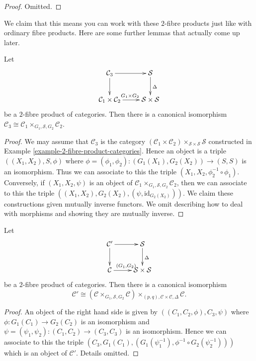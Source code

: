 \begin{proof}
Omitted.
\end{proof}

\noindent
We claim that this means you can work with these $2$-fibre products
just like with ordinary fibre products. Here are some further lemmas
that actually come up later.

\begin{lemma}
\label{lemma-diagonal-1}
Let
$$
\xymatrix{
\mathcal{C}_3 \ar[r] \ar[d] & \mathcal{S} \ar[d]^\Delta \\
\mathcal{C}_1 \times \mathcal{C}_2 \ar[r]^{G_1 \times G_2} &
\mathcal{S} \times \mathcal{S}
}
$$
be a $2$-fibre product of categories.
Then there is a canonical isomorphism
$\mathcal{C}_3 \cong
\mathcal{C}_1 \times_{G_1, \mathcal{S}, G_2} \mathcal{C}_2$.
\end{lemma}

\begin{proof}
We may assume that $\mathcal{C}_3$ is the category
$(\mathcal{C}_1 \times \mathcal{C}_2)\times_{\mathcal{S} \times \mathcal{S}}
\mathcal{S}$ constructed in Example \ref{example-2-fibre-product-categories}.
Hence an object is a triple
$((X_1, X_2), S, \phi)$ where
$\phi = (\phi_1, \phi_2) : (G_1(X_1), G_2(X_2)) \to (S, S)$
is an isomorphism. Thus we can associate to this the triple
$(X_1, X_2, \phi_2^{-1} \circ \phi_1)$.
Conversely, if $(X_1, X_2, \psi)$ is an object of
$\mathcal{C}_1 \times_{G_1, \mathcal{S}, G_2} \mathcal{C}_2$,
then we can associate to this the triple
$((X_1, X_2), G_2(X_2), (\psi, \text{id}_{G_2(X_2)}))$.
We claim these constructions given mutually inverse functors.
We omit describing how to deal with morphisms
and showing they are mutually inverse.
\end{proof}

\begin{lemma}
\label{lemma-diagonal-2}
Let
$$
\xymatrix{
\mathcal{C}' \ar[r] \ar[d] & \mathcal{S} \ar[d]^\Delta \\
\mathcal{C} \ar[r]^{(G_1, G_2)} &
\mathcal{S} \times \mathcal{S}
}
$$
be a $2$-fibre product of categories.
Then there is a canonical isomorphism
$$
\mathcal{C}' \cong
(\mathcal{C} \times_{G_1, \mathcal{S}, G_2} \mathcal{C})
\times_{(p, q), \mathcal{C} \times \mathcal{C}, \Delta}
\mathcal{C}.
$$
\end{lemma}

\begin{proof}
An object of the right hand side is given by
$((C_1, C_2, \phi), C_3, \psi)$ where
$\phi : G_1(C_1) \to G_2(C_2)$ is an isomorphism
and $\psi = (\psi_1, \psi_2) : (C_1, C_2) \to (C_3, C_3)$ is
an isomorphism. Hence we can associate to this the triple
$(C_3, G_1(C_1), (G_1(\psi_1^{-1}), \phi^{-1} \circ G_2(\psi_2^{-1})))$
which is an object of $\mathcal{C}'$.
Details omitted.
\end{proof}

